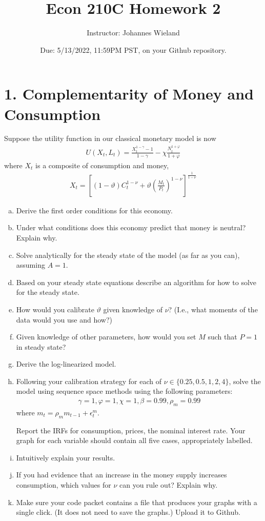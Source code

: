 \documentclass{article}
\newcommand{\1}{\mathbf{1}}
\begin{document}
\title{Econ 210C Homework 2}
\author{Instructor: Johannes Wieland}
\date{\color{red} Due: 5/13/2022, 11:59PM PST, on your Github repository.}
\maketitle




\section*{1. Complementarity of Money and Consumption}
Suppose the utility function in our classical monetary model is now
\begin{align*}
	U(X_t,L_t)=\frac{X_t^{1-\gamma}-1}{1-\gamma}-\chi \frac{N_t^{1+\varphi}}{{1+\varphi}}
\end{align*}
where $X_t$ is a composite of consumption and money,
\begin{align*}
	X_t=\left[(1-\vartheta)C_t^{1-\nu}+\vartheta\left(\frac{M_t}{P_t}\right)^{1-\nu}\right]^{\frac{1}{1-\nu}}
\end{align*}
\begin{enumerate}[(a)]
	\item Derive the first order conditions for this economy.
	\item Under what conditions does this economy predict that money is neutral? Explain why.
	\item Solve analytically for the steady state of the model (as far as you can), assuming $A=1$.
	\item Based on your steady state equations describe an algorithm for how to solve for the steady state.
	\item How would you calibrate $\vartheta$ given knowledge of $\nu$? (I.e., what moments of the data would you use and how?)
	\item Given knowledge of other parameters, how would you set $M$ such that $P=1$ in steady state?
	\item Derive the log-linearized model. 
	\item Following your calibration strategy for each of $\nu\in\{0.25,0.5,1,2,4\}$, solve the model using sequence space methods using the following parameters:
	\begin{align*} \gamma=1,\varphi=1,\chi=1,\beta=0.99,\rho_m=0.99
	\end{align*}
	where $m_t = \rho_m m_{t-1} + \epsilon_t^m$.
	
	Report the IRFs for consumption, prices, the nominal interest rate. Your graph for each variable should contain all five cases, appropriately labelled. 
	\item Intuitively explain your results.
	\item If you had evidence that an increase in the money supply increases consumption, which values for $\nu$ can you rule out? Explain why.
	\item Make sure your code packet contains a file that produces your graphs with a single click. (It does not need to save the graphs.) Upload it to Github.
\end{enumerate}
\end{document}
